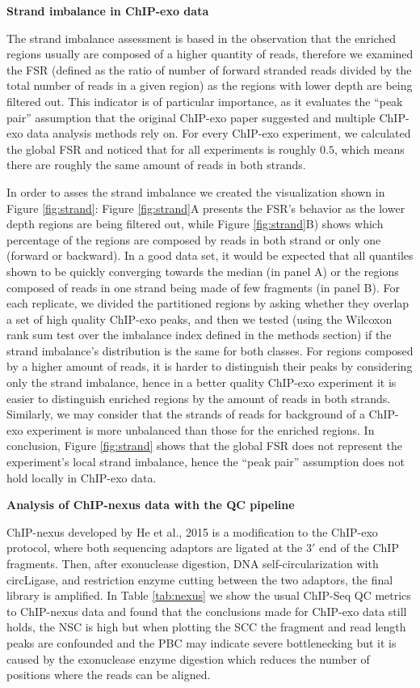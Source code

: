 \documentclass{bmcart}\usepackage[]{graphicx}\usepackage[]{color}
\begin{document}
\textbf{Strand imbalance in ChIP-exo data}

The strand imbalance assessment is based in the observation that the
enriched regions usually are composed of a higher quantity of reads,
therefore we examined the FSR (defined as the ratio of number of
forward stranded reads divided by the total number of reads in a given
region) as the regions with lower depth are being filtered out. This
indicator is of particular importance, as it evaluates the ``peak
pair'' assumption that the original ChIP-exo paper suggested and
multiple ChIP-exo data analysis methods rely on. For every ChIP-exo
experiment, we calculated the global FSR and noticed that for all
experiments is roughly $0.5$, which means there are roughly the same
amount of reads in both strands. 

In order to asses the strand imbalance we created the visualization
shown in Figure \ref{fig:strand}: Figure \ref{fig:strand}A presents
the FSR's behavior as the lower depth regions are being filtered out,
while Figure \ref{fig:strand}B) shows which percentage of the regions
are composed by reads in both strand or only one (forward or
backward). In a good data set, it would be expected that all quantiles
shown to be quickly converging towards the median (in panel A) or the
regions composed of reads in one strand being made of few fragments
(in panel B). For each replicate, we divided the partitioned regions
by asking whether they overlap a set of high quality ChIP-exo peaks,
and then we tested (using the Wilcoxon rank sum test over the
imbalance index defined in the methods section) if the strand
imbalance's distribution is the same for both classes. For regions
composed by a higher amount of reads, it is harder to distinguish
their peaks by considering only the strand imbalance, hence in a
better quality ChIP-exo experiment it is easier to distinguish
enriched regions by the amount of reads in both strands. Similarly, we
may consider that the strands of reads for background of a ChIP-exo
experiment is more unbalanced than those for the enriched regions. In
conclusion, Figure \ref{fig:strand} shows that the global FSR does not
represent the experiment's local strand imbalance, hence the ``peak
pair'' assumption does not hold locally in ChIP-exo data. 

\textbf{Analysis of ChIP-nexus data with the QC pipeline}

ChIP-nexus developed by He et al., 2015 \cite{chipnexus} is a
modification to the ChIP-exo protocol, where both sequencing adaptors
are ligated at the $3\prime$ end of the ChIP fragments. Then, after
exonuclease digestion, DNA self-circularization with circLigase, and
restriction enzyme cutting between the two adaptors, the final library
is amplified. In Table \ref{tab:nexus} we show the usual ChIP-Seq QC
metrics to ChIP-nexus data and found that the conclusions made for
ChIP-exo data still holds, the NSC is high but when plotting the SCC
the fragment and read length peaks are confounded and the PBC may
indicate severe bottlenecking but it is caused by the exonuclease
enzyme digestion which reduces the number of positions where the
reads can be aligned. 
\end{document}
